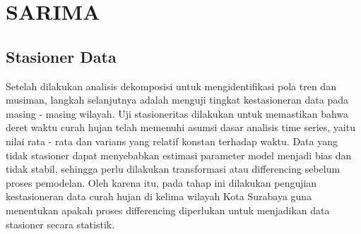 \section{SARIMA}
\subsection{Stasioner Data}
Setelah dilakukan analisis dekomposisi untuk mengidentifikasi pola tren dan musiman, langkah selanjutnya adalah menguji tingkat kestasioneran data pada masing - masing wilayah.
Uji stasioneritas dilakukan untuk memastikan bahwa deret waktu curah hujan telah memenuhi asumsi dasar analisis time series, yaitu nilai rata - rata dan varians yang relatif konstan terhadap waktu.
Data yang tidak stasioner dapat menyebabkan estimasi parameter model menjadi bias dan tidak stabil, sehingga perlu dilakukan transformasi atau differencing sebelum proses pemodelan.
Oleh karena itu, pada tahap ini dilakukan pengujian kestasioneran data curah hujan di kelima wilayah Kota Surabaya guna menentukan apakah proses differencing diperlukan untuk menjadikan data stasioner secara statistik.
